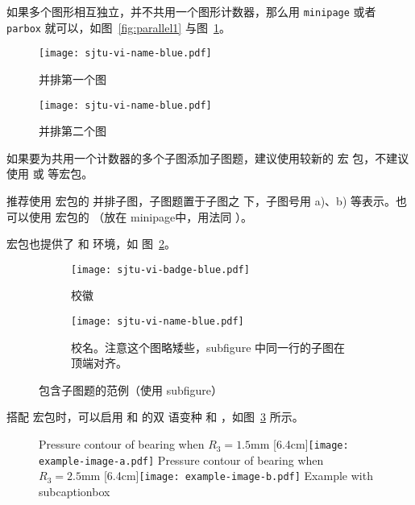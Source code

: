 如果多个图形相互独立，并不共用一个图形计数器，那么用 \texttt{minipage} 或者
\texttt{parbox} 就可以，如图~\ref{fig:parallel1} 与图~\ref{fig:parallel2}。

\begin{figure}[!htp]
\begin{minipage}{0.48\textwidth}
  \centering
  \texttt{[image: sjtu-vi-name-blue.pdf]}
  \caption{并排第一个图}
  \label{fig:parallel1}
\end{minipage}\hfill
\begin{minipage}{0.48\textwidth}
  \centering
  \texttt{[image: sjtu-vi-name-blue.pdf]}
  \caption{并排第二个图}
  \label{fig:parallel2}
\end{minipage}
\end{figure}

如果要为共用一个计数器的多个子图添加子图题，建议使用较新的 宏
包，不建议使用  或  等宏包。

推荐使用  宏包的  并排子图，子图题置于子图之
下，子图号用 a)、b) 等表示。也可以使用  宏包的 
（放在 minipage中，用法同 ）。

 宏包也提供了  和  环境，如
图~\ref{fig:subfigure}。

\begin{figure}[!htp]
  \centering
  \begin{subfigure}{0.3\textwidth}
    \centering
    \texttt{[image: sjtu-vi-badge-blue.pdf]}
    \caption{校徽}
  \end{subfigure}
  \hspace{1cm}
  \begin{subfigure}{0.4\textwidth}
    \centering
    \texttt{[image: sjtu-vi-name-blue.pdf]}
    \caption{校名。注意这个图略矮些，subfigure 中同一行的子图在顶端对齐。}
  \end{subfigure}
  \caption{包含子图题的范例（使用 subfigure）}
  \label{fig:subfigure}
\end{figure}

搭配  宏包时，可以启用  和  的双
语变种  和 ，如图~\ref{fig:bisubcaptionbox}
所示。

\begin{figure}[!hbtp]
  \centering
                  {Pressure contour of bearing when $R_3 = 1.5\text{mm}$}%
                  [6.4cm]{\texttt{[image: example-image-a.pdf]}}
  \hspace{1cm}
                  {Pressure contour of bearing when $R_3 = 2.5\text{mm}$}%
                  [6.4cm]{\texttt{[image: example-image-b.pdf]}}
            {Example with subcaptionbox}
  \label{fig:bisubcaptionbox}
\end{figure}


